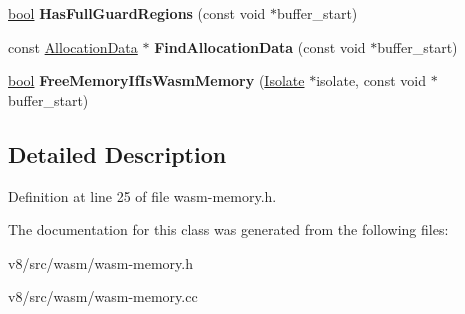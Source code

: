 \begin{DoxyCompactItemize}
\mbox{\hyperlink{classbool}{bool}} {\bfseries Has\+Full\+Guard\+Regions} (const void $\ast$buffer\+\_\+start)
\item 
\mbox{\label{classv8_1_1internal_1_1wasm_1_1WasmMemoryTracker_a2faa753c4d25b2abd8a55ed5283ed4fa}} 
const \mbox{\hyperlink{structv8_1_1internal_1_1wasm_1_1WasmMemoryTracker_1_1AllocationData}{Allocation\+Data}} $\ast$ {\bfseries Find\+Allocation\+Data} (const void $\ast$buffer\+\_\+start)
\item 
\mbox{\label{classv8_1_1internal_1_1wasm_1_1WasmMemoryTracker_a84fc3e8d7cc812cfb687c61a01db1b4d}} 
\mbox{\hyperlink{classbool}{bool}} {\bfseries Free\+Memory\+If\+Is\+Wasm\+Memory} (\mbox{\hyperlink{classv8_1_1internal_1_1Isolate}{Isolate}} $\ast$isolate, const void $\ast$buffer\+\_\+start)
\end{DoxyCompactItemize}


\subsection{Detailed Description}


Definition at line 25 of file wasm-\/memory.\+h.



The documentation for this class was generated from the following files\+:\begin{DoxyCompactItemize}
\item 
v8/src/wasm/wasm-\/memory.\+h\item 
v8/src/wasm/wasm-\/memory.\+cc\end{DoxyCompactItemize}
